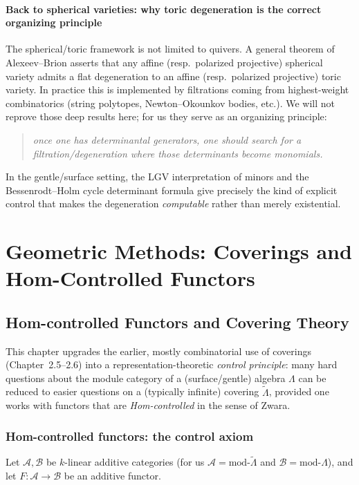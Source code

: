 \documentclass[11pt,oneside]{amsbook}
\numberwithin{equation}{section}
\theoremstyle{plain}
\theoremstyle{definition}
\theoremstyle{remark}
\begin{document}
\subsection{Back to spherical varieties: why toric degeneration is the correct organizing principle}
\label{sec:back_to_spherical_toric_det}

The spherical/toric framework is not limited to quivers.
A general theorem of Alexeev--Brion \cite{AlexeevBrion2004ToricDegenerations} asserts that any affine (resp.\ polarized projective) spherical variety admits a flat degeneration to an affine (resp.\ polarized projective) toric variety.
In practice this is implemented by filtrations coming from highest-weight combinatorics (string polytopes, Newton--Okounkov bodies, etc.).
We will not reprove those deep results here; for us they serve as an organizing principle:
\begin{quote}
\emph{once one has determinantal generators, one should search for a filtration/degeneration where those determinants become monomials.}
\end{quote}
In the gentle/surface setting, the LGV interpretation of minors and the Bessenrodt--Holm cycle determinant formula give precisely the kind of explicit control that makes the degeneration \emph{computable} rather than merely existential.



\part{Geometric Methods: Coverings and Hom-Controlled Functors}

\chapter{Hom-controlled Functors and Covering Theory}\label{ch:homcontrolled}

This chapter upgrades the earlier, mostly combinatorial use of coverings (Chapter~2.5--2.6) into a
representation-theoretic \emph{control principle}: many hard questions about the module category of a
(surface/gentle) algebra $\Lambda$ can be reduced to easier questions on a (typically infinite) covering
$\widetilde{\Lambda}$, provided one works with functors that are \emph{Hom-controlled} in the sense of
Zwara.

\section{Hom-controlled functors: the control axiom}
Let $\mathcal{A},\mathcal{B}$ be $k$-linear additive categories (for us $\mathcal{A}=\mathrm{mod}\text{-}\widetilde{\Lambda}$
and $\mathcal{B}=\mathrm{mod}\text{-}\Lambda$), and let $F:\mathcal{A}\to\mathcal{B}$ be an additive functor.
\end{document}
